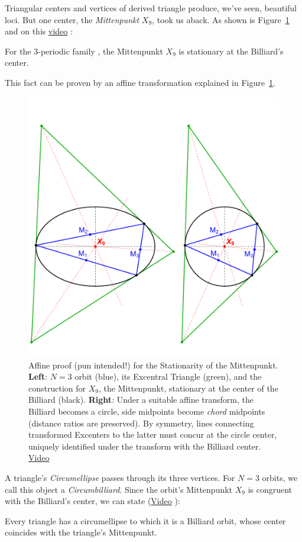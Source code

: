 Triangular centers and vertices of derived triangle produce, we've seen, beautiful loci. But one center, the {\em Mittenpunkt} $X_9$, took us aback. As shown is Figure~\ref{fig:mitten} and on this \href{https://youtu.be/tMrBqfRBYik}{video} \cite[video \#13]{dsr_math_intell_playlist}:

\begin{theorem}
For the 3-periodic family , the Mittenpunkt $X_9$ is stationary at the Billiard's center.
\label{thm:olga}
\end{theorem}

This fact can be proven by an affine transformation \cite{olga19_mitten} explained in Figure~\ref{fig:mitten}. 

\begin{figure}[H]
     \centering
    \includegraphics[width=.8\linewidth]{pics/u0051_mitten_proof.pdf}    
     \caption{Affine proof (pun intended!) \cite{olga19_mitten} for the Stationarity of the Mittenpunkt. \textbf{Left}: $N=3$ orbit (blue), its Excentral Triangle (green), and the construction for $X_9$, the Mittenpunkt, stationary at the center of the Billiard (black). \textbf{Right}: Under a suitable affine transform, the Billiard becomes a circle, side midpoints become {\em chord} midpoints (distance ratios are preserved). By symmetry, lines connecting transformed Excenters to the latter must concur at the circle center, uniquely identified under the transform with the Billiard center.
     \href{https://youtu.be/tMrBqfRBYik}{Video} \cite[pl\#13]{dsr_math_intell_playlist}}
     \label{fig:mitten} 
\end{figure}

A triangle's {\em Circumellipse} \cite{mw} passes through its three vertices. For $N=3$ orbits, we call this object a {\em Circumbilliard}. Since the orbit's Mittenpunkt $X_9$ is congruent with the Billiard's center, we can state (\href{https://youtu.be/vSCnorIJ2X8}{Video} \cite[pl\#14]{dsr_math_intell_playlist}):
%
\begin{corollary}
Every triangle has a circumellipse to which it is a Billiard orbit, whose center coincides with the triangle's Mittenpunkt.
\end{corollary}
